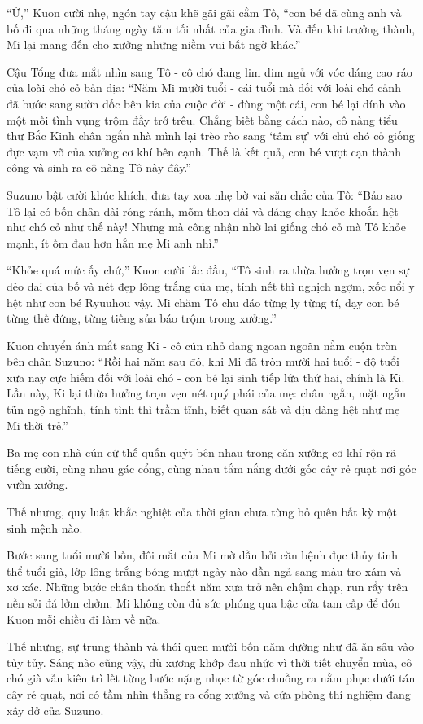 \documentclass[../main.tex]{subfiles}
\begin{document}
``Ừ,'' Kuon cười nhẹ, ngón tay cậu khẽ gãi gãi cằm Tô, ``con bé đã cùng anh và bố đi qua những tháng ngày tăm tối nhất của gia đình. Và đến khi trưởng thành, Mi lại mang đến cho xưởng những niềm vui bất ngờ khác.''

Cậu Tổng đưa mắt nhìn sang Tô - cô chó đang lim dim ngủ với vóc dáng cao ráo của loài chó cỏ bản địa: ``Năm Mi mười tuổi - cái tuổi mà đối với loài chó cảnh đã bước sang sườn dốc bên kia của cuộc đời - đùng một cái, con bé lại dính vào một mối tình vụng trộm đầy trớ trêu. Chẳng biết bằng cách nào, cô nàng tiểu thư Bắc Kinh chân ngắn nhà mình lại trèo rào sang `tâm sự' với chú chó cỏ giống đực vạm vỡ của xưởng cơ khí bên cạnh. Thế là kết quả, con bé vượt cạn thành công và sinh ra cô nàng Tô này đây.''

Suzuno bật cười khúc khích, đưa tay xoa nhẹ bờ vai săn chắc của Tô: ``Bảo sao Tô lại có bốn chân dài rỏng rảnh, mõm thon dài và dáng chạy khỏe khoắn hệt như chó cỏ như thế này! Nhưng mà công nhận nhờ lai giống chó cỏ mà Tô khỏe mạnh, ít ốm đau hơn hẳn mẹ Mi anh nhỉ.''

``Khỏe quá mức ấy chứ,'' Kuon cười lắc đầu, ``Tô sinh ra thừa hưởng trọn vẹn sự dẻo dai của bố và nét đẹp lông trắng của mẹ, tính nết thì nghịch ngợm, xốc nổi y hệt như con bé Ryuuhou vậy. Mi chăm Tô chu đáo từng ly từng tí, dạy con bé từng thế đứng, từng tiếng sủa báo trộm trong xưởng.''

Kuon chuyển ánh mắt sang Ki - cô cún nhỏ đang ngoan ngoãn nằm cuộn tròn bên chân Suzuno: ``Rồi hai năm sau đó, khi Mi đã tròn mười hai tuổi - độ tuổi xưa nay cực hiếm đối với loài chó - con bé lại sinh tiếp lứa thứ hai, chính là Ki. Lần này, Ki lại thừa hưởng trọn vẹn nét quý phái của mẹ: chân ngắn, mặt ngắn tũn ngộ nghĩnh, tính tình thì trầm tĩnh, biết quan sát và dịu dàng hệt như mẹ Mi thời trẻ.''

Ba mẹ con nhà cún cứ thế quấn quýt bên nhau trong căn xưởng cơ khí rộn rã tiếng cười, cùng nhau gác cổng, cùng nhau tắm nắng dưới gốc cây rẻ quạt nơi góc vườn xưởng.

Thế nhưng, quy luật khắc nghiệt của thời gian chưa từng bỏ quên bất kỳ một sinh mệnh nào.

Bước sang tuổi mười bốn, đôi mắt của Mi mờ dần bởi căn bệnh đục thủy tinh thể tuổi già, lớp lông trắng bóng mượt ngày nào dần ngả sang màu tro xám và xơ xác. Những bước chân thoăn thoắt năm xưa trở nên chậm chạp, run rẩy trên nền sỏi đá lởm chởm. Mi không còn đủ sức phóng qua bậc cửa tam cấp để đón Kuon mỗi chiều đi làm về nữa.

Thế nhưng, sự trung thành và thói quen mười bốn năm dường như đã ăn sâu vào tủy tủy. Sáng nào cũng vậy, dù xương khớp đau nhức vì thời tiết chuyển mùa, cô chó già vẫn kiên trì lết từng bước nặng nhọc từ góc chuồng ra nằm phục dưới tán cây rẻ quạt, nơi có tầm nhìn thẳng ra cổng xưởng và cửa phòng thí nghiệm đang xây dở của Suzuno.
\end{document}
